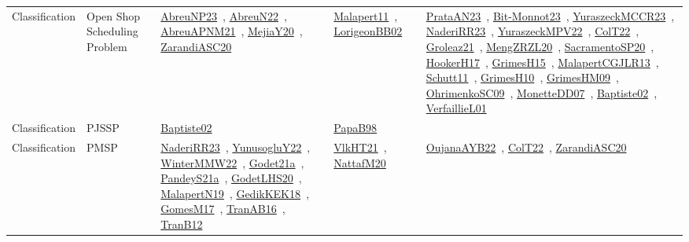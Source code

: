 {\begin{longtable}{lp{3cm}>{\raggedright\arraybackslash}p{6cm}>{\raggedright\arraybackslash}p{6cm}>{\raggedright\arraybackslash}p{8cm}}
Classification & Open Shop Scheduling Problem & \href{works/AbreuNP23.pdf}{AbreuNP23}~\cite{AbreuNP23}, \href{works/AbreuN22.pdf}{AbreuN22}~\cite{AbreuN22}, \href{works/AbreuAPNM21.pdf}{AbreuAPNM21}~\cite{AbreuAPNM21}, \href{works/MejiaY20.pdf}{MejiaY20}~\cite{MejiaY20}, \href{works/ZarandiASC20.pdf}{ZarandiASC20}~\cite{ZarandiASC20} & \href{works/Malapert11.pdf}{Malapert11}~\cite{Malapert11}, \href{works/LorigeonBB02.pdf}{LorigeonBB02}~\cite{LorigeonBB02} & \href{works/PrataAN23.pdf}{PrataAN23}~\cite{PrataAN23}, \href{works/Bit-Monnot23.pdf}{Bit-Monnot23}~\cite{Bit-Monnot23}, \href{works/YuraszeckMCCR23.pdf}{YuraszeckMCCR23}~\cite{YuraszeckMCCR23}, \href{works/NaderiRR23.pdf}{NaderiRR23}~\cite{NaderiRR23}, \href{works/YuraszeckMPV22.pdf}{YuraszeckMPV22}~\cite{YuraszeckMPV22}, \href{works/ColT22.pdf}{ColT22}~\cite{ColT22}, \href{works/Groleaz21.pdf}{Groleaz21}~\cite{Groleaz21}, \href{works/MengZRZL20.pdf}{MengZRZL20}~\cite{MengZRZL20}, \href{works/SacramentoSP20.pdf}{SacramentoSP20}~\cite{SacramentoSP20}, \href{works/HookerH17.pdf}{HookerH17}~\cite{HookerH17}, \href{works/GrimesH15.pdf}{GrimesH15}~\cite{GrimesH15}, \href{works/MalapertCGJLR13.pdf}{MalapertCGJLR13}~\cite{MalapertCGJLR13}, \href{works/Schutt11.pdf}{Schutt11}~\cite{Schutt11}, \href{works/GrimesH10.pdf}{GrimesH10}~\cite{GrimesH10}, \href{works/GrimesHM09.pdf}{GrimesHM09}~\cite{GrimesHM09}, \href{works/OhrimenkoSC09.pdf}{OhrimenkoSC09}~\cite{OhrimenkoSC09}, \href{works/MonetteDD07.pdf}{MonetteDD07}~\cite{MonetteDD07}, \href{works/Baptiste02.pdf}{Baptiste02}~\cite{Baptiste02}, \href{works/VerfaillieL01.pdf}{VerfaillieL01}~\cite{VerfaillieL01}\\
Classification & PJSSP & \href{works/Baptiste02.pdf}{Baptiste02}~\cite{Baptiste02} & \href{works/PapaB98.pdf}{PapaB98}~\cite{PapaB98} & \\
Classification & PMSP & \href{works/NaderiRR23.pdf}{NaderiRR23}~\cite{NaderiRR23}, \href{works/YunusogluY22.pdf}{YunusogluY22}~\cite{YunusogluY22}, \href{works/WinterMMW22.pdf}{WinterMMW22}~\cite{WinterMMW22}, \href{works/Godet21a.pdf}{Godet21a}~\cite{Godet21a}, \href{works/PandeyS21a.pdf}{PandeyS21a}~\cite{PandeyS21a}, \href{works/GodetLHS20.pdf}{GodetLHS20}~\cite{GodetLHS20}, \href{works/MalapertN19.pdf}{MalapertN19}~\cite{MalapertN19}, \href{works/GedikKEK18.pdf}{GedikKEK18}~\cite{GedikKEK18}, \href{works/GomesM17.pdf}{GomesM17}~\cite{GomesM17}, \href{works/TranAB16.pdf}{TranAB16}~\cite{TranAB16}, \href{works/TranB12.pdf}{TranB12}~\cite{TranB12} & \href{works/VlkHT21.pdf}{VlkHT21}~\cite{VlkHT21}, \href{works/NattafM20.pdf}{NattafM20}~\cite{NattafM20} & \href{works/OujanaAYB22.pdf}{OujanaAYB22}~\cite{OujanaAYB22}, \href{works/ColT22.pdf}{ColT22}~\cite{ColT22}, \href{works/ZarandiASC20.pdf}{ZarandiASC20}~\cite{ZarandiASC20}\\

\end{longtable}}
